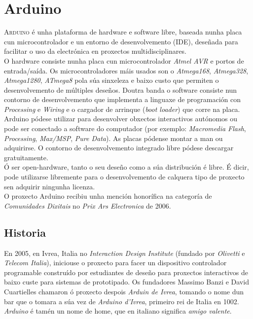 \chapter{Arduino}
\label{chap:arduino}


\lettrine{A}{rduino} \cite{WikipediaArduino} é unha plataforma de hardware e
software libre, baseada nunha placa cun microcontrolador e un entorno de
desenvolvemento (IDE), deseñada para facilitar o uso da electrónica en
proxectos multidisciplinares. \\

O hardware consiste nunha placa cun microcontrolador \textit{Atmel AVR} e
portos de entrada/saída. Os microcontroladores máis usados son o
\textit{Atmega168}, \textit{Atmega328}, \textit{Atmega1280}, \textit{ATmega8}
pola súa sinxeleza e baixo custo que permiten o desenvolvemento de múltiples
deseños. Doutra banda o software consiste nun contorno de desenvolvemento que
implementa a linguaxe de programación con \textit{Processing} e \textit{Wiring}
e o cargador de arrinque (\textit{boot loader}) que corre na placa. \\

Arduino pódese utilizar para desenvolver obxectos interactivos autónomos ou
pode ser conectado a software do computador (por exemplo:
\textit{Macromedia Flash}, \textit{Processing}, \textit{Max/MSP},
\textit{Pure Data}). As placas pódense montar a man ou adquirirse. O contorno
de desenvolvemento integrado libre pódese descargar gratuitamente. \\

Ó ser open-hardware, tanto o seu deseño como a súa distribución é libre.
É dicir, pode utilizarse libremente para o desenvolvemento de calquera tipo de
proxecto sen adquirir ningunha licenza. \\

O proxecto Arduino recibiu unha mención honorífica na categoría de
\textit{Comunidades Dixitais} no \textit{Prix Ars Electronica} de 2006.

\section{Historia}

En 2005, en Ivrea, Italia no \textit{Interaction Design Institute} (fundado por
\textit{Olivetti} e \textit{Telecom Italia}), iniciouse o proxecto para facer
un dispositivo controlador programable construído por estudiantes de deseño
para proxectos interactivos de baixo custe para sistemas de prototipado. Os
fundadores Massimo Banzi e David Cuartielles chamaron ó proxecto despois
\textit{Arduin de Ivrea}, tomando o nome dun bar que o tomara a súa vez de
\textit{Arduino d'Ivrea}, primeiro rei de Italia en 1002. \textit{Arduino} é
tamén un nome de home, que en italiano significa \textit{amigo valente}. \\

